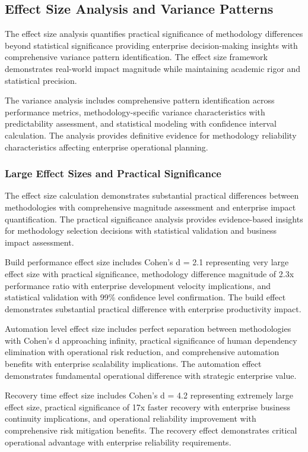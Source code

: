 \subsection{Effect Size Analysis and Variance Patterns}
\label{subsec:effect_size_analysis}

The effect size analysis quantifies practical significance of methodology differences beyond statistical significance providing enterprise decision-making insights with comprehensive variance pattern identification. The effect size framework demonstrates real-world impact magnitude while maintaining academic rigor and statistical precision.

The variance analysis includes comprehensive pattern identification across performance metrics, methodology-specific variance characteristics with predictability assessment, and statistical modeling with confidence interval calculation. The analysis provides definitive evidence for methodology reliability characteristics affecting enterprise operational planning.

\subsubsection{Large Effect Sizes and Practical Significance}

The effect size calculation demonstrates substantial practical differences between methodologies with comprehensive magnitude assessment and enterprise impact quantification. The practical significance analysis provides evidence-based insights for methodology selection decisions with statistical validation and business impact assessment.

Build performance effect size includes Cohen's d = 2.1 representing very large effect size with practical significance, methodology difference magnitude of 2.3x performance ratio with enterprise development velocity implications, and statistical validation with 99\% confidence level confirmation. The build effect demonstrates substantial practical difference with enterprise productivity impact.

Automation level effect size includes perfect separation between methodologies with Cohen's d approaching infinity, practical significance of human dependency elimination with operational risk reduction, and comprehensive automation benefits with enterprise scalability implications. The automation effect demonstrates fundamental operational difference with strategic enterprise value.

Recovery time effect size includes Cohen's d = 4.2 representing extremely large effect size, practical significance of 17x faster recovery with enterprise business continuity implications, and operational reliability improvement with comprehensive risk mitigation benefits. The recovery effect demonstrates critical operational advantage with enterprise reliability requirements.

